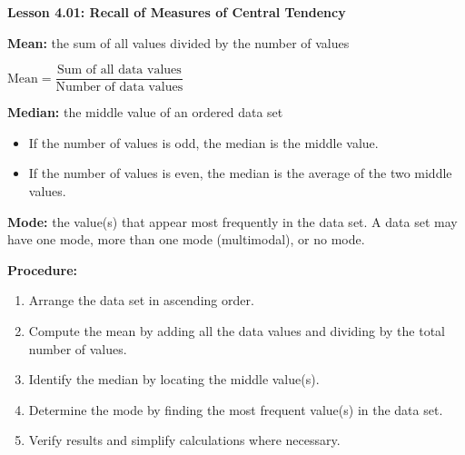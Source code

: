 \begin{center}
\textbf{Lesson 4.01: Recall of Measures of Central Tendency}
\end{center}

\vspace*{-1.5ex}

\noindent \textbf{Mean:} the sum of all values divided by the number of values

{\centering $
    \text{Mean} = \dfrac{\text{Sum of all data values}}{\text{Number of data values}}
$\par}
    
\noindent  \textbf{Median:} the middle value of an ordered data set
    \begin{itemize}
        \item If the number of values is odd, the median is the middle value.  
        \item If the number of values is even, the median is the average of the two middle values.
    \end{itemize}
    
\noindent  \textbf{Mode:} the value(s) that appear most frequently in the data set.  A data set may have one mode, more than one mode (multimodal), or no mode.


\noindent\textbf{Procedure:}  
\begin{enumerate}
    \item Arrange the data set in ascending order.  
    \item Compute the mean by adding all the data values and dividing by the total number of values.  
    \item Identify the median by locating the middle value(s).  
    \item Determine the mode by finding the most frequent value(s) in the data set.  
    \item Verify results and simplify calculations where necessary.
\end{enumerate}
